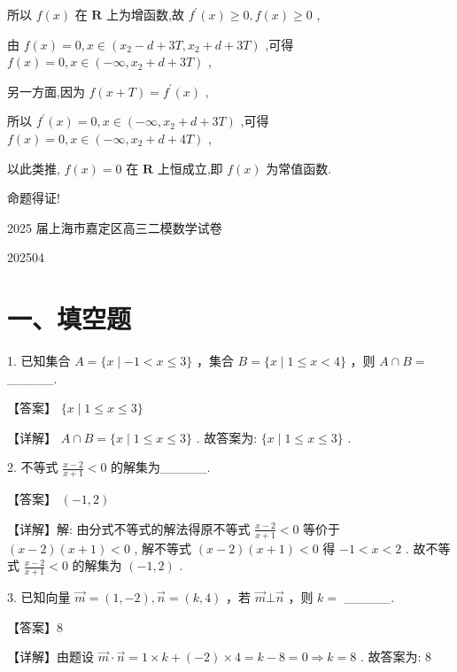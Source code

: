 \documentclass[10pt]{article}
\begin{document}
所以 \(f\left( x\right)\) 在 \(\mathbf{R}\) 上为增函数,故 \({f}^{\prime }\left( x\right)  \geq  0,f\left( x\right)  \geq  0\) ,

由 \(f\left( x\right)  = 0,x \in  \left( {{x}_{2} - d + {3T},{x}_{2} + d + {3T}}\right)\) ,可得 \(f\left( x\right)  = 0,x \in  \left( {-\infty ,{x}_{2} + d + {3T}}\right)\) ,

另一方面,因为 \(f\left( {x + T}\right)  = {f}^{\prime }\left( x\right)\) ,

所以 \({f}^{\prime }\left( x\right)  = 0,x \in  \left( {-\infty ,{x}_{2} + d + {3T}}\right)\) ,可得 \(f\left( x\right)  = 0,x \in  \left( {-\infty ,{x}_{2} + d + {4T}}\right)\) ,

以此类推, \(f\left( x\right)  = 0\) 在 \(\mathbf{R}\) 上恒成立,即 \(f\left( x\right)\) 为常值函数.

命题得证!

2025 届上海市嘉定区高三二模数学试卷

202504

\section*{一、填空题}

1. 已知集合 \(A = \{ x \mid   - 1 < x \leq  3\}\) ，集合 \(B = \{ x \mid  1 \leq  x < 4\}\) ，则 \(A \cap  B =\) \_\_\_\_\_.

【答案】 \(\{ x \mid  1 \leq  x \leq  3\}\)

【详解】 \(A \cap  B = \{ x \mid  1 \leq  x \leq  3\}\) . 故答案为: \(\{ x \mid  1 \leq  x \leq  3\}\) .

2. 不等式 \(\frac{x - 2}{x + 1} < 0\) 的解集为\_\_\_\_\_.

【答案】 \(\left( {-1,2}\right)\)

【详解】解: 由分式不等式的解法得原不等式 \(\frac{x - 2}{x + 1} < 0\) 等价于 \(\left( {x - 2}\right) \left( {x + 1}\right)  < 0\) , 解不等式 \(\left( {x - 2}\right) \left( {x + 1}\right)  < 0\) 得 \(- 1 < x < 2\) . 故不等式 \(\frac{x - 2}{x + 1} < 0\) 的解集为 \(\left( {-1,2}\right)\) .

3. 已知向量 \(\overrightarrow{m} = \left( {1, - 2}\right) ,\overrightarrow{n} = \left( {k,4}\right)\) ，若 \(\overrightarrow{m} \bot  \overrightarrow{n}\) ，则 \(k =\) \_\_\_\_\_.

【答案】8

【详解】由题设 \(\overrightarrow{m} \cdot  \overrightarrow{n} = 1 \times  k + \left( {-2}\right)  \times  4 = k - 8 = 0 \Rightarrow  k = 8\) . 故答案为: 8
\end{document}
